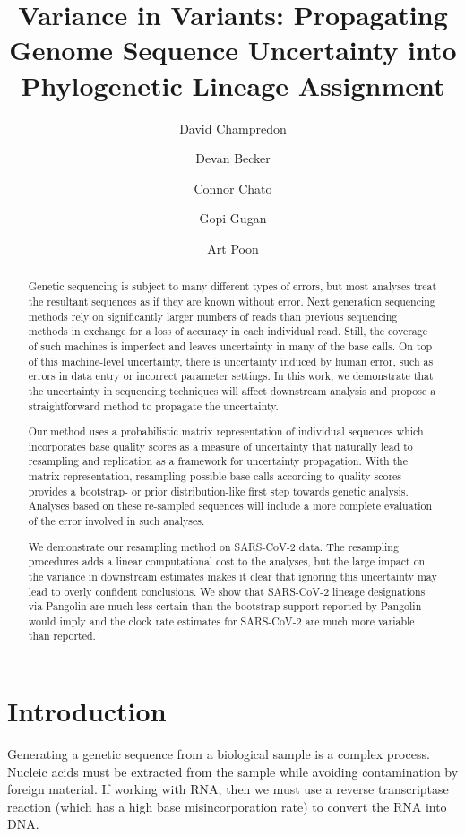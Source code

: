 \documentclass[10pt]{article}
\title{Variance in Variants: Propagating Genome Sequence Uncertainty
into Phylogenetic Lineage Assignment}
\author[1,2,*]{David Champredon}
\author[1,*]{Devan Becker}
\author[1]{Connor Chato}
\author[1]{Gopi Gugan}
\author[1]{Art Poon}
\affil[1]{Department of Pathology and Laboratory Medicine, Schulich School of Medicine and Dentistry, Western University. London, Ontario, Canada.}
\affil[2]{Public Health Agency of Canada - National Microbiology Laboratory - Public Health Risk Sciences Division. Guelph, Ontario, Canada.}
\affil[*]{contributed equally}
\begin{document}
\maketitle

\normalsize
\vspace{1cm}
\tableofcontents

\begin{abstract}
Genetic sequencing is subject to many different types of errors, but most analyses treat the resultant sequences as if they are known without error.
Next generation sequencing methods rely on significantly larger numbers of reads than previous sequencing methods in exchange for a loss of accuracy in each individual read.
Still, the coverage of such machines is imperfect and leaves uncertainty in many of the base calls.
On top of this machine-level uncertainty, there is uncertainty induced by human error, such as errors in data entry or incorrect parameter settings.
In this work, we demonstrate that the uncertainty in sequencing techniques will affect downstream analysis and propose a straightforward method to propagate the uncertainty.

Our method uses a probabilistic matrix representation of individual sequences which incorporates base quality scores as a measure of uncertainty that naturally lead to resampling and replication as a framework for uncertainty propagation.
With the matrix representation, resampling possible base calls according to quality scores provides a bootstrap- or prior distribution-like first step towards genetic analysis.
Analyses based on these re-sampled sequences will include a more complete evaluation of the error involved in such analyses.

We demonstrate our resampling method on SARS-CoV-2 data.
The resampling procedures adds a linear computational cost to the analyses, but the large impact on the variance in downstream estimates makes it clear that ignoring this uncertainty may lead to overly confident conclusions.
We show that SARS-CoV-2 lineage designations via Pangolin are much less certain than the bootstrap support reported by Pangolin would imply and the clock rate estimates for SARS-CoV-2 are much more variable than reported.
\end{abstract}


\section{Introduction}

Generating a genetic sequence from a biological sample is a complex process.
Nucleic acids must be extracted from the sample while avoiding contamination by foreign material.
If working with RNA, then we must use a reverse transcriptase reaction (which has a high base misincorporation rate) to convert the RNA into DNA. 
\end{document}
